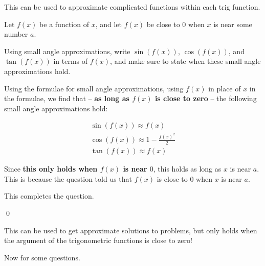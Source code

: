 This can be used to approximate complicated functions within each trig function.

\begin{example}
    Let $f(x)$ be a function of $x$, and let $f(x)$ be close to $0$ when $x$ is near some number $a$.

    Using small angle approximations, write $\sin(f(x))$, $\cos(f(x))$, and $\tan(f(x))$ in terms of $f(x)$, and make sure to state when 
    these small angle approximations hold.
\end{example}
\begin{solution}
    Using the formulae for small angle approximations, using $f(x)$ in place of $x$ in the formulae, we find that 
    -- \textbf{as long as $f(x)$ is close to zero} -- the following small angle approximations hold:

    \begin{align*}
        \sin (f(x)) \approx f(x) \\
        \cos (f(x)) \approx 1  - \frac{f(x)^2}{2}\\
        \tan (f(x)) \approx f(x) 
    \end{align*}

    Since \textbf{this only holds when $f(x)$ is near $0$}, this holds as long as $x$ is near $a$. This is because the question told us that 
    $f(x)$ is close to $0$ when $x$ is near $a$.

    This completes the question.

    \qed
\end{solution}

This can be used to get approximate solutions to problems, but only holds when the argument of the trigonometric functions is close to zero!

Now for some questions. 

